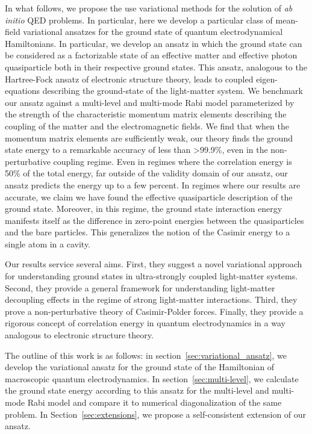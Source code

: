 \documentclass[aps,prb,twocolumn,
	groupedaddress,superscriptaddress,
	amsfonts,amssymb,amsmath,floatfix,
	citeautoscript]{revtex4-1}
\begin{document}
In what follows, we propose the use variational methods for the solution of \emph{ab initio} QED problems. In particular, here we develop a particular class of mean-field variational ansatzes for the ground state of quantum electrodynamical Hamiltonians. In particular, we develop an ansatz in which the ground state can be considered as a factorizable state of an effective matter and effective photon quasiparticle both in their respective ground states. This ansatz, analogous to the Hartree-Fock ansatz of electronic structure theory, leads to coupled eigen-equations describing the ground-state of the light-matter system. We benchmark our ansatz against a multi-level and multi-mode Rabi model parameterized by the strength of the characteristic momentum matrix elements describing the coupling of the matter and the electromagnetic fields. We find that when the momentum matrix elements are sufficiently weak, our theory finds the ground state energy to a remarkable accuracy of less than >99.9\%, even in the non-perturbative coupling regime. Even in regimes where the correlation energy is 50\% of the total energy, far outside of the validity domain of our ansatz, our ansatz predicts the energy up to a few percent. In regimes where our results are accurate, we claim we have found the effective quasiparticle description of the ground state. Moreover, in this regime, the ground state interaction energy manifests itself as the difference in zero-point energies between the quasiparticles and the bare particles. This generalizes the notion of the Casimir energy to a single atom in a cavity.

Our results service several aims. First, they suggest a novel variational approach for understanding ground states in ultra-strongly coupled light-matter systems. Second, they provide a general framework for understanding light-matter decoupling effects in the regime of strong light-matter interactions. Third, they prove a non-perturbative theory of Casimir-Polder forces. Finally, they provide a rigorous concept of correlation energy in quantum electrodynamics in a way analogous to electronic structure theory. 

The outline of this work is as follows: in section~\ref{sec:variational_ansatz}, we develop the variational ansatz for the ground state of the Hamiltonian of macroscopic quantum electrodynamics. In section~\ref{sec:multi-level}, we calculate the ground state energy according to this ansatz for the multi-level and multi-mode Rabi model and compare it to numerical diagonalization of the same problem. In Section~\ref{sec:extensions}, we propose a self-consistent extension of our ansatz. 
\end{document}
